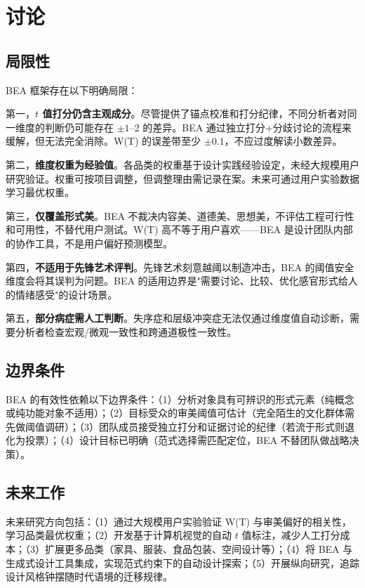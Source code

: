 \documentclass[10pt,a4paper]{article}
\begin{document}
\section{讨论}

\subsection{局限性}

BEA 框架存在以下明确局限：

第一，\textbf{$t$ 值打分仍含主观成分}。尽管提供了锚点校准和打分纪律，不同分析者对同一维度的判断仍可能存在 $\pm1$--2 的差异。BEA 通过独立打分+分歧讨论的流程来缓解，但无法完全消除。W(T) 的误差带至少 $\pm 0.1$，不应过度解读小数差异。

第二，\textbf{维度权重为经验值}。各品类的权重基于设计实践经验设定，未经大规模用户研究验证。权重可按项目调整，但调整理由需记录在案。未来可通过用户实验数据学习最优权重。

第三，\textbf{仅覆盖形式美}。BEA 不裁决内容美、道德美、思想美，不评估工程可行性和可用性，不替代用户测试。W(T) 高不等于用户喜欢——BEA 是设计团队内部的协作工具，不是用户偏好预测模型。

第四，\textbf{不适用于先锋艺术评判}。先锋艺术刻意越阈以制造冲击，BEA 的阈值安全维度会将其误判为问题。BEA 的适用边界是"需要讨论、比较、优化感官形式给人的情绪感受"的设计场景。

第五，\textbf{部分病症需人工判断}。失序症和层级冲突症无法仅通过维度值自动诊断，需要分析者检查宏观/微观一致性和跨通道极性一致性。

\subsection{边界条件}

BEA 的有效性依赖以下边界条件：（1）分析对象具有可辨识的形式元素（纯概念或纯功能对象不适用）；（2）目标受众的审美阈值可估计（完全陌生的文化群体需先做阈值调研）；（3）团队成员接受独立打分和证据讨论的纪律（若流于形式则退化为投票）；（4）设计目标已明确（范式选择需匹配定位，BEA 不替团队做战略决策）。

\subsection{未来工作}

未来研究方向包括：（1）通过大规模用户实验验证 W(T) 与审美偏好的相关性，学习品类最优权重；（2）开发基于计算机视觉的自动 $t$ 值标注，减少人工打分成本；（3）扩展更多品类（家具、服装、食品包装、空间设计等）；（4）将 BEA 与生成式设计工具集成，实现范式约束下的自动设计探索；（5）开展纵向研究，追踪设计风格钟摆随时代语境的迁移规律。
\end{document}
